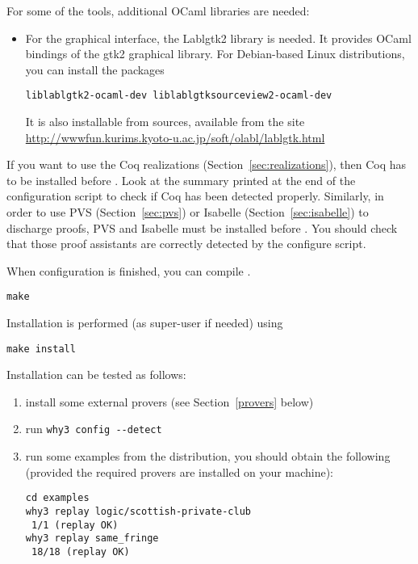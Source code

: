 \noindent
For some of the \why tools, additional OCaml libraries are needed:
\begin{itemize}
\item For the graphical interface, the Lablgtk2 library is needed.
  It provides OCaml
  bindings of the gtk2 graphical library. For Debian-based Linux
  distributions, you can install the packages
\begin{verbatim}
liblablgtk2-ocaml-dev liblablgtksourceview2-ocaml-dev
\end{verbatim}
It is also installable from sources, available from the site
\url{http://wwwfun.kurims.kyoto-u.ac.jp/soft/olabl/lablgtk.html}

\end{itemize}


If you want to use the Coq realizations
(Section~\ref{sec:realizations}), then Coq has to be installed before
\why. Look at the summary printed at the end of the configuration
script to check if Coq has been detected properly. Similarly, in order to
use PVS (Section~\ref{sec:pvs}) or Isabelle (Section~\ref{sec:isabelle})
to discharge proofs, PVS and Isabelle must be
installed before \why. You should check that those proof assistants
are correctly detected by the configure script.

When configuration is finished, you can compile \why.
\begin{verbatim}
make
\end{verbatim}
Installation is performed (as super-user if needed) using
\begin{verbatim}
make install
\end{verbatim}
Installation can be tested as follows:
\begin{enumerate}
\item install some external provers (see Section~\ref{provers} below)
\item run \verb|why3 config --detect|
\item run some examples from the distribution, \eg you should
obtain the following (provided the required provers are installed on
your machine):
\begin{verbatim}
cd examples
why3 replay logic/scottish-private-club
 1/1 (replay OK)
why3 replay same_fringe
 18/18 (replay OK)
\end{verbatim}
\end{enumerate}

